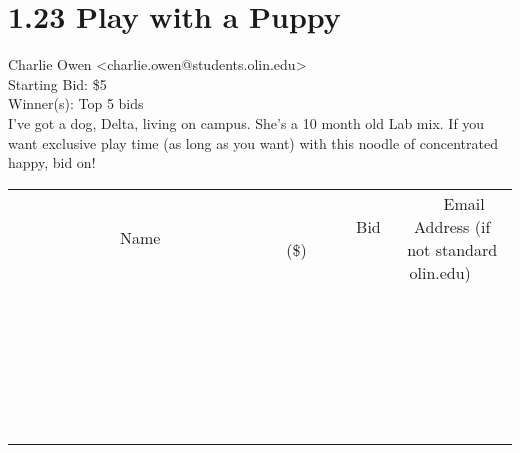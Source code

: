 \documentclass[11pt]{article}
\begin{document}
					\section*{1.23 Play with a Puppy}
					Charlie Owen <charlie.owen@students.olin.edu> \\
					Starting Bid: \$5 \\
					Winner(s): Top 5 bids \\
					I've got a dog, Delta, living on campus. She's a 10 month old Lab mix. If you want exclusive play time (as long as you want) with this noodle of concentrated happy, bid on! \\
					[6ex]
					\begin{tabular}{c c c}
						~~~~~~~~~~~~~Name~~~~~~~~~~~~~ & ~~~~~~~~~Bid (\$)~~~~~~~~~ & ~~~Email Address (if not standard olin.edu)~~~ \\
				
 & & \\
\hline
 & & \\
\hline
 & & \\
\hline
 & & \\
\hline
 & & \\
\hline
 & & \\
\hline
 & & \\
\hline
 & & \\
\hline
 & & \\
\hline
 & & \\
\hline
 & & \\
\hline
 & & \\
\hline
 & & \\
\hline
 & & \\
\hline
 & & \\
\hline
 & & \\
\hline
 & & \\
\hline
 & & \\
\hline
 & & \\
\hline
 & & \\
\hline
 & & \\
\hline
 & & \\
\hline
 & & \\
\hline
 & & \\
\hline
 & & \\
\hline
 & & \\
\hline
					\end{tabular}
					\clearpage
				
\end{document}
